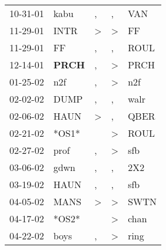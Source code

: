 \begin{supertabular}{p{0.07\textwidth}p{0.06\textwidth}p{0.02\textwidth}p{0.02\textwidth}p{0.06\textwidth}}
          10-31-01\textsuperscript{} &           kabu\textsuperscript{} &                , &                , &            VAN\textsuperscript{} \\
          11-29-01\textsuperscript{} &           INTR\textsuperscript{} &     \textgreater &     \textgreater &             FF\textsuperscript{} \\
          11-29-01\textsuperscript{} &             FF\textsuperscript{} &                , &                , &           ROUL\textsuperscript{} \\
          12-14-01\textsuperscript{} &  \textbf{PRCH\textsuperscript{}} &                , &     \textgreater &           PRCH\textsuperscript{} \\
          01-25-02\textsuperscript{} &            n2f\textsuperscript{} &                , &     \textgreater &            n2f\textsuperscript{} \\
          02-02-02\textsuperscript{} &           DUMP\textsuperscript{} &                , &                , &           walr\textsuperscript{} \\
          02-06-02\textsuperscript{} &           HAUN\textsuperscript{} &     \textgreater &                , &           QBER\textsuperscript{} \\
          02-21-02\textsuperscript{} &                            *OS1* &                  &     \textgreater &           ROUL\textsuperscript{} \\
          02-27-02\textsuperscript{} &           prof\textsuperscript{} &                , &     \textgreater &            sfb\textsuperscript{} \\
          03-06-02\textsuperscript{} &           gdwn\textsuperscript{} &                , &                , &            2X2\textsuperscript{} \\
          03-19-02\textsuperscript{} &           HAUN\textsuperscript{} &                , &                , &            sfb\textsuperscript{} \\
          04-05-02\textsuperscript{} &           MANS\textsuperscript{} &     \textgreater &     \textgreater &           SWTN\textsuperscript{} \\
          04-17-02\textsuperscript{} &                            *OS2* &                  &     \textgreater &           chan\textsuperscript{} \\
          04-22-02\textsuperscript{} &           boys\textsuperscript{} &                , &     \textgreater &           ring\textsuperscript{} \\

\end{supertabular}
